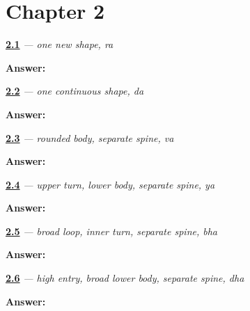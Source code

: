 \section*{Chapter 2}

\noindent\begin{minipage}[t]{\linewidth}
\raggedright
\hyperlink{review-GU-W02-ra-recall}{\textbf{2.1}} \emph{ — one new shape, ra}\par
\small \textbf{Answer:} \par
\end{minipage}\par\medskip

\noindent\begin{minipage}[t]{\linewidth}
\raggedright
\hyperlink{review-GU-W02-da-recall}{\textbf{2.2}} \emph{ — one continuous shape, da}\par
\small \textbf{Answer:} \par
\end{minipage}\par\medskip

\noindent\begin{minipage}[t]{\linewidth}
\raggedright
\hyperlink{review-GU-W02-va-recall}{\textbf{2.3}} \emph{ — rounded body, separate spine, va}\par
\small \textbf{Answer:} \par
\end{minipage}\par\medskip

\noindent\begin{minipage}[t]{\linewidth}
\raggedright
\hyperlink{review-GU-W02-ya-recall}{\textbf{2.4}} \emph{ — upper turn, lower body, separate spine, ya}\par
\small \textbf{Answer:} \par
\end{minipage}\par\medskip

\noindent\begin{minipage}[t]{\linewidth}
\raggedright
\hyperlink{review-GU-W02-bha-recall}{\textbf{2.5}} \emph{ — broad loop, inner turn, separate spine, bha}\par
\small \textbf{Answer:} \par
\end{minipage}\par\medskip

\noindent\begin{minipage}[t]{\linewidth}
\raggedright
\hyperlink{review-GU-W02-dha-recall}{\textbf{2.6}} \emph{ — high entry, broad lower body, separate spine, dha}\par
\small \textbf{Answer:} \par
\end{minipage}\par\medskip

